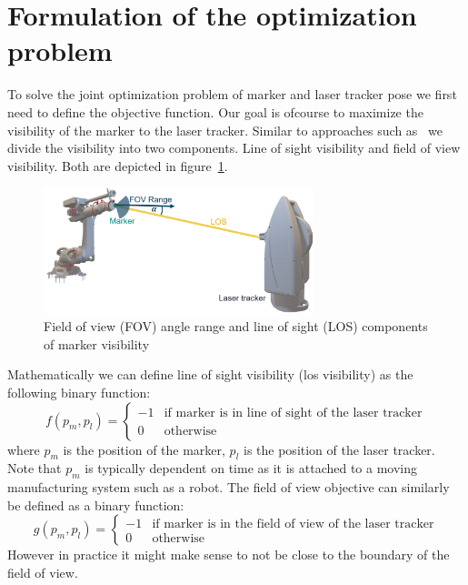\documentclass{svproc}
\begin{document}
\section{Formulation of the optimization problem}
To solve the joint optimization problem of marker and laser tracker pose we first need to define the objective function.
Our goal is ofcourse to maximize the visibility of the marker to the laser tracker.
Similar to approaches such as~\cite{ieee_sensors} we divide the visibility into two components.
Line of sight visibility and field of view visibility.
Both  are depicted in figure~\ref{fig:visibility}.
\begin{figure}
        \centering
        \includegraphics[width=0.7\textwidth]{figures/visibility.png}
        \caption{Field of view (FOV) angle range and line of sight (LOS) components of marker visibility}
        \label{fig:visibility}
\end{figure}
Mathematically we can define line of sight visibility (los visibility) as the following binary function:
\begin{equation}
    f(p_m,p_l) = \begin{cases}
    -1 & \text{if } \text{marker is in line of sight of the laser tracker} \\
    0 & \text{otherwise}
    \end{cases}
\end{equation}
where $p_m$ is the position of the marker, $p_l$ is the position of the laser tracker.
Note that $p_m$ is typically dependent on time as it is attached to a moving manufacturing system such as a robot.
The field of view objective can similarly be defined as a binary function:
\begin{equation}
    g(p_m,p_l) = \begin{cases}
    -1 & \text{if } \text{marker is in the field of view of the laser tracker} \\
    0 & \text{otherwise}
    \end{cases}
\end{equation}
However in practice it might make sense to not be close to the boundary of the field of view.
\end{document}

